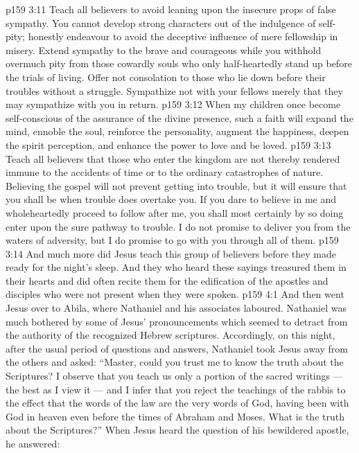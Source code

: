 \vs p159 3:11 Teach all believers to avoid leaning upon the insecure props of false sympathy. You cannot develop strong characters out of the indulgence of self\hyp{}pity; honestly endeavour to avoid the deceptive influence of mere fellowship in misery. Extend sympathy to the brave and courageous while you withhold overmuch pity from those cowardly souls who only half\hyp{}heartedly stand up before the trials of living. Offer not consolation to those who lie down before their troubles without a struggle. Sympathize not with your fellows merely that they may sympathize with you in return.
\vs p159 3:12 \pc When my children once become self\hyp{}conscious of the assurance of the divine presence, such a faith will expand the mind, ennoble the soul, reinforce the personality, augment the happiness, deepen the spirit perception, and enhance the power to love and be loved.
\vs p159 3:13 Teach all believers that those who enter the kingdom are not thereby rendered immune to the accidents of time or to the ordinary catastrophes of nature. Believing the gospel will not prevent getting into trouble, but it will ensure that you shall be  when trouble does overtake you. If you dare to believe in me and wholeheartedly proceed to follow after me, you shall most certainly by so doing enter upon the sure pathway to trouble. I do not promise to deliver you from the waters of adversity, but I do promise to go with you through all of them.
\vs p159 3:14 \pc And much more did Jesus teach this group of believers before they made ready for the night’s sleep. And they who heard these sayings treasured them in their hearts and did often recite them for the edification of the apostles and disciples who were not present when they were spoken.
\vs p159 4:1 And then went Jesus over to Abila, where Nathaniel and his associates laboured. Nathaniel was much bothered by some of Jesus’ pronouncements which seemed to detract from the authority of the recognized Hebrew scriptures. Accordingly, on this night, after the usual period of questions and answers, Nathaniel took Jesus away from the others and asked: “Master, could you trust me to know the truth about the Scriptures? I observe that you teach us only a portion of the sacred writings --- the best as I view it --- and I infer that you reject the teachings of the rabbis to the effect that the words of the law are the very words of God, having been with God in heaven even before the times of Abraham and Moses. What is the truth about the Scriptures?” When Jesus heard the question of his bewildered apostle, he answered:
